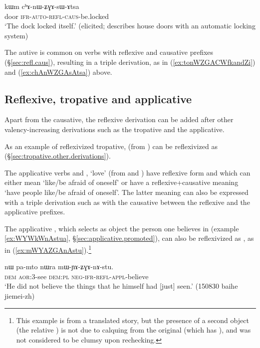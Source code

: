 \begin{exe}
\ex \label{ex:chAnWZGAsAtsa}
\gll  kɯm cʰɤ-nɯ-ʑɣɤ-sɯ-ɤtsa \\
door \textsc{ifr}-\textsc{auto}-\textsc{refl}-\textsc{caus}-be.locked \\
\glt `The dock locked itself.' (elicited; describes house doors with an automatic locking system)
\end{exe}

The autive is common on verbs with reflexive and causative prefixes (§\ref{sec:refl.caus}), resulting in a triple derivation, as in (\ref{ex:tonWZGACWfkandZi}) and (\ref{ex:chAnWZGAsAtsa}) above.

 \subsection{Reflexive, tropative and applicative} \label{sec:refl.tropative}
   
Apart from the causative, the reflexive derivation can be added after other valency-increasing derivations such as the tropative and the applicative. 

As an example of reflexivized tropative,  (from ) can be reflexivized as  (§\ref{sec:tropative.other.derivations}).

The applicative verbs  and , `love' (from  and ) have reflexive form  and   which can either mean `like/be afraid of oneself' or have a reflexive+causative meaning `have people like/be afraid of oneself'. The latter meaning can also be expressed with a triple derivation such as   with the causative  between the reflexive and the applicative prefixes.

The applicative , which selects as object the person one believes in (example \ref{ex:WYWkWnAstua}, §\ref{sec:applicative.promoted}), can also be reflexivized as , as in (\ref{ex:mWYAZGAnAstu}).\footnote{This example is from a translated story, but the presence of a second object (the relative ) is not due to calquing from the original (which has ), and was not considered to be clumsy upon rechecking. }

\begin{exe}
\ex \label{ex:mWYAZGAnAstu}
\gll nɯ pa-mto nɯra mɯ-ɲɤ-ʑɣɤ-nɤ-stu.  \\
\textsc{dem} \textsc{aor}:3\flobv{}-see \textsc{dem}:\textsc{pl} \textsc{neg}-\textsc{ifr}-\textsc{refl}-\textsc{appl}-believe \\
\glt `He did not believe the things that he himself had [just] seen.' (150830 baihe jiemei-zh) 
\end{exe}

